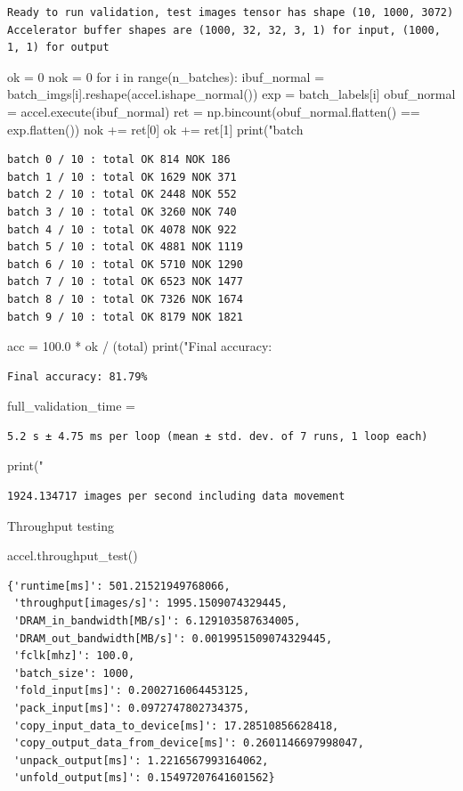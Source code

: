 \documentclass[11pt]{article}
\begin{document}
\begin{verbatim}
Ready to run validation, test images tensor has shape (10, 1000, 3072)
Accelerator buffer shapes are (1000, 32, 32, 3, 1) for input, (1000, 1, 1) for output
\end{verbatim}
\begin{jupytercell}
ok = 0
nok = 0
for i in range(n_batches):
    ibuf_normal = batch_imgs[i].reshape(accel.ishape_normal())
    exp = batch_labels[i]
    obuf_normal = accel.execute(ibuf_normal)
    ret = np.bincount(obuf_normal.flatten() == exp.flatten())
    nok += ret[0]
    ok += ret[1]
    print("batch %
\end{jupytercell}
\begin{verbatim}
batch 0 / 10 : total OK 814 NOK 186
batch 1 / 10 : total OK 1629 NOK 371
batch 2 / 10 : total OK 2448 NOK 552
batch 3 / 10 : total OK 3260 NOK 740
batch 4 / 10 : total OK 4078 NOK 922
batch 5 / 10 : total OK 4881 NOK 1119
batch 6 / 10 : total OK 5710 NOK 1290
batch 7 / 10 : total OK 6523 NOK 1477
batch 8 / 10 : total OK 7326 NOK 1674
batch 9 / 10 : total OK 8179 NOK 1821
\end{verbatim}
\begin{jupytercell}
acc = 100.0 * ok / (total)
print("Final accuracy: {}%
\end{jupytercell}
\begin{verbatim}
Final accuracy: 81.79%
\end{verbatim}
\begin{jupytercell}
full_validation_time = %
\end{jupytercell}
\begin{verbatim}
5.2 s ± 4.75 ms per loop (mean ± std. dev. of 7 runs, 1 loop each)
\end{verbatim}
\begin{jupytercell}
print("%
\end{jupytercell}
\begin{verbatim}
1924.134717 images per second including data movement
\end{verbatim}
Throughput testing
\begin{jupytercell}
accel.throughput_test()
\end{jupytercell}
\begin{verbatim}
{'runtime[ms]': 501.21521949768066,
 'throughput[images/s]': 1995.1509074329445,
 'DRAM_in_bandwidth[MB/s]': 6.129103587634005,
 'DRAM_out_bandwidth[MB/s]': 0.0019951509074329445,
 'fclk[mhz]': 100.0,
 'batch_size': 1000,
 'fold_input[ms]': 0.2002716064453125,
 'pack_input[ms]': 0.0972747802734375,
 'copy_input_data_to_device[ms]': 17.28510856628418,
 'copy_output_data_from_device[ms]': 0.2601146697998047,
 'unpack_output[ms]': 1.2216567993164062,
 'unfold_output[ms]': 0.15497207641601562}
\end{verbatim}
\end{document}
